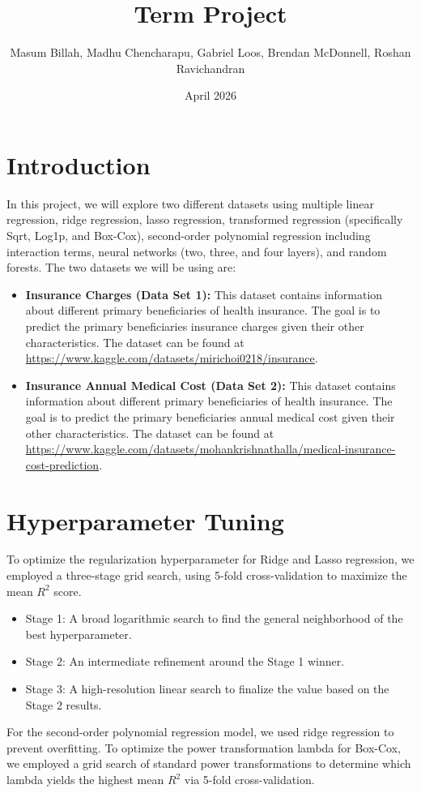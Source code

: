 \documentclass{article}
\title{Term Project}
\author{Masum Billah, Madhu Chencharapu, Gabriel Loos, Brendan McDonnell, Roshan Ravichandran}
\date{April 2026}
\begin{document}
\maketitle

\section{Introduction}

In this project, we will explore two different datasets using multiple linear regression, ridge regression, lasso regression, transformed regression (specifically Sqrt, Log1p, and Box-Cox), second-order polynomial regression including interaction terms, neural networks (two, three, and four layers), and random forests. The two datasets we will be using are:

\begin{itemize}
	\item \textbf{Insurance Charges (Data Set 1):} This dataset contains information about different primary beneficiaries of health insurance. The goal is to predict the primary beneficiaries insurance charges given their other characteristics. The dataset can be found at \url{https://www.kaggle.com/datasets/mirichoi0218/insurance}.
	\item \textbf{Insurance Annual Medical Cost (Data Set 2):} This dataset contains information about different primary beneficiaries of health insurance. The goal is to predict the primary beneficiaries annual medical cost given their other characteristics. The dataset can be found at\\ \url{https://www.kaggle.com/datasets/mohankrishnathalla/medical-insurance-cost-prediction}.
\end{itemize}

\section{Hyperparameter Tuning}

To optimize the regularization hyperparameter for Ridge and Lasso regression, we employed a three-stage grid search, using 5-fold cross-validation to maximize the mean $R^2$ score.
\begin{itemize}
	\item Stage 1: A broad logarithmic search to find the general neighborhood of the best hyperparameter.
	\item Stage 2: An intermediate refinement around the Stage 1 winner.
	\item Stage 3: A high-resolution linear search to finalize the value based on the Stage 2 results.
\end{itemize}
For the second-order polynomial regression model, we used ridge regression to prevent overfitting. To optimize the power transformation lambda for Box-Cox, we employed a grid search of standard power transformations to determine which lambda yields the highest mean $R^2$ via 5-fold cross-validation.
\end{document}
